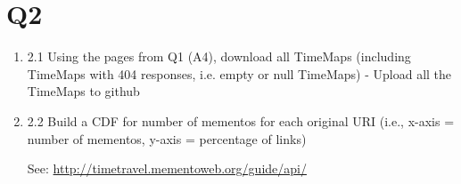 
\section{Q2}
\label{part2}
\begin{enumerate}

\item 2.1 Using the pages from Q1 (A4), download all TimeMaps (including TimeMaps with 404 responses, i.e. empty or null TimeMaps) 
\subitem - Upload all the TimeMaps to github

\item 2.2 Build a CDF for number of mementos for each original URI (i.e., x-axis = number of mementos, y-axis = percentage of links)

\subitem See: \url{http://timetravel.mementoweb.org/guide/api/}



\end{enumerate}

